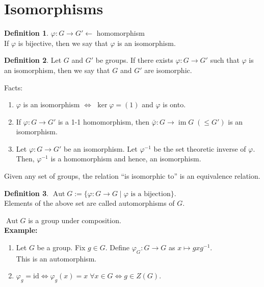\documentclass[12 pt, a4paper, toc=graduated, oneside]{article}
\theoremstyle{definition}
\newtheorem{defn}{Definition}
\newcommand{\im}{\operatorname{im}}
\begin{document}
\section{Isomorphisms}
\begin{defn}
	$\varphi : G \to G' \longleftarrow$ homomorphism\\
	If $\varphi$ is bijective, then we say that $\varphi$ is an isomorphism.
\end{defn}
\begin{defn}
	Let $G$ and $G'$ be groups. If there exists $\varphi:G \to G'$ such that $\varphi$ is an isomorphism, then we say that $G$ and $G'$ are isomorphic.
\end{defn}
Facts:
\begin{enumerate}[nosep] 
	\item $\varphi$ is an isomorphism $\iff$ $\ker \varphi = (1)$ and $\varphi$ is onto.
	\item If $\varphi:G\to G'$ is a 1-1 homomorphism, then $\bar{\varphi}:G\to \im G \;(\le G')$ is an isomorphism.
	\item Let $\varphi:G \to G'$ be an isomorphism. Let $\varphi^{-1}$ be the set theoretic inverse of $\varphi.$ Then, $\varphi^{-1}$ is a homomorphism and hence, an isomorphism.
\end{enumerate}
Given any set of groups, the relation ``is isomorphic to'' is an equivalence relation.
\begin{defn}
	$\operatorname{Aut} G := \{\varphi : G \to G \mid \varphi \text{ is a bijection}\}.$\\
	Elements of the above set are called automorphisms of $G.$
\end{defn}
$\operatorname{Aut} G$ is a group under composition.\\
\textbf{Example:}
\begin{enumerate}[nosep] 
	\item Let $G$ be a group. Fix $g \in G.$ Define $\varphi_G:G \to G$ as $x \mapsto gxg^{-1}.$\\
	This is an automorphism.
	\item $\varphi_g = \text{id} \iff \varphi_g(x) = x \; \forall x \in G \iff g \in Z(G).$
\end{enumerate}
%
\end{document}
